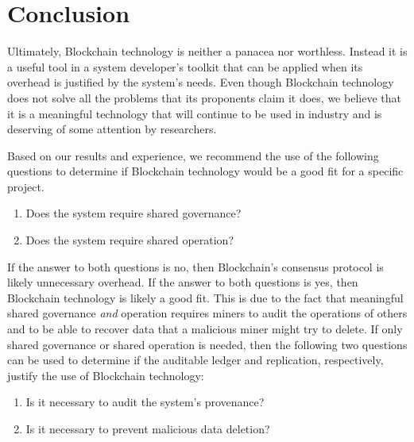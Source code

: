 

\section{Conclusion}
Ultimately, Blockchain technology is neither a panacea nor worthless.
Instead it is a useful tool in a system developer's toolkit that can be applied when its overhead is justified by the system's needs.
Even though Blockchain technology does not solve all the problems that its 
proponents claim it does, we believe that it is a meaningful technology that 
will continue to be used in industry and is deserving of some attention by 
researchers.

Based on our results and experience, we recommend the use of the following 
questions to determine if Blockchain technology would be a good fit for a 
specific project.%

\begin{enumerate}
	\item Does the system require shared governance?
	\item Does the system require shared operation?
\end{enumerate}

If the answer to both questions is no, then Blockchain's consensus protocol is 
likely unnecessary overhead. If the answer to both questions is yes, then 
Blockchain technology is likely a good fit. This is due to the fact that 
meaningful shared governance \emph{and} operation requires miners to audit the 
operations of others and to be able to recover data that a malicious miner 
might try to delete. %
If only shared governance or shared operation is needed, then the following two 
questions can be used to determine if the auditable ledger and replication, 
respectively, justify the use of Blockchain technology:

\begin{enumerate}[start=3]
	\item Is it necessary to audit the system's provenance?
	\item Is it necessary to prevent malicious data deletion?
\end{enumerate}

